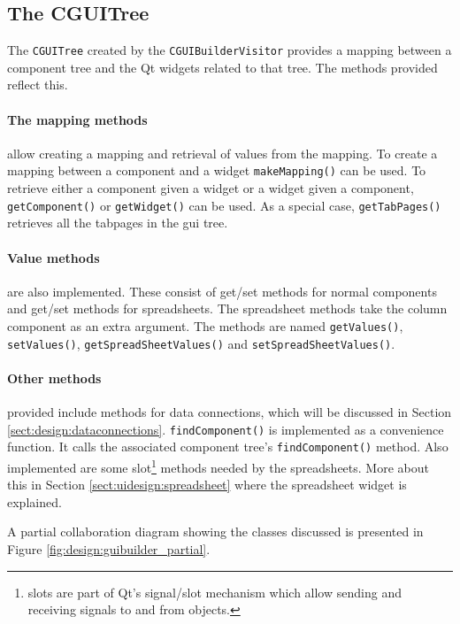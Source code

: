 \subsection{The CGUITree}
The \verb=CGUITree= created by the \verb=CGUIBuilderVisitor= provides a mapping
between a component tree and the Qt widgets related to that tree. The methods
provided reflect this.

\paragraph{The mapping methods} allow creating a mapping and retrieval of
values from the mapping. To create a mapping between a component and a widget
\verb=makeMapping()= can be used. To retrieve either a component given a widget
or a widget given a component, \verb=getComponent()= or \verb=getWidget()= can
be used. As a special case, \verb=getTabPages()= retrieves all the tabpages in
the gui tree.

\paragraph{Value methods} are also implemented. These consist of get/set
methods for normal components and get/set methods for spreadsheets. The
spreadsheet methods take the column component as an extra argument. The methods
are named \verb=getValues()=, \verb=setValues()=, \verb=getSpreadSheetValues()=
and \linebreak \verb=setSpreadSheetValues()=.

\paragraph{Other methods} provided include methods for data connections, which
will be discussed in Section \ref{sect:design:dataconnections}.
\verb=findComponent()= is implemented as a convenience function. It calls the
associated component tree's \verb=findComponent()= method. Also implemented are
some slot\footnote{slots are part of Qt's signal/slot mechanism which allow
sending and receiving signals to and from objects.} methods needed by the
spreadsheets. More about this in Section \ref{sect:uidesign:spreadsheet} where
the spreadsheet widget is explained.

\bigskip \noindent
A partial collaboration diagram showing the classes discussed is presented in
Figure \ref{fig:design:guibuilder_partial}.

